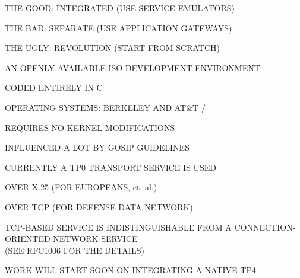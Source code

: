 \begin{bwslide}

\begin{nrtc}
\item	THE GOOD: INTEGRATED (USE SERVICE EMULATORS)

\item	THE BAD: SEPARATE (USE APPLICATION GATEWAYS)

\item	THE UGLY: REVOLUTION (START FROM SCRATCH)
\end{nrtc}
\end{bwslide}


\begin{bwslide}

\begin{nrtc}
\item	AN OPENLY AVAILABLE ISO DEVELOPMENT ENVIRONMENT

\item	CODED ENTIRELY IN C

\item	OPERATING SYSTEMS: BERKELEY AND AT\&T \unix/
    \begin{nrtc}
    \item	REQUIRES NO KERNEL MODIFICATIONS
    \end{nrtc}

\item	INFLUENCED A LOT BY GOSIP GUIDELINES
\end{nrtc}
\end{bwslide}






\begin{bwslide}

\begin{nrtc}
\item	CURRENTLY A TP0 TRANSPORT SERVICE IS USED
    \begin{nrtc}
    \item	OVER X.25 (FOR EUROPEANS, et. al.)

    \item	OVER TCP (FOR DEFENSE DATA NETWORK)
    \end{nrtc}

\item	TCP-BASED SERVICE IS INDISTINGUISHABLE FROM A CONNECTION-ORIENTED
	NETWORK SERVICE\\ (SEE RFC1006 FOR THE DETAILS)

\item	WORK WILL START SOON ON INTEGRATING A NATIVE TP4
\end{nrtc}
\end{bwslide}


